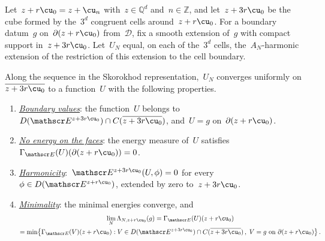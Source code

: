 \documentclass[11pt]{amsart}
\begin{document}
Let~$z+r\cu_0=z+\cu_n$ with~$z\in\mathbb Q^d$ and~$n\in\mathbb Z$, and let~$z+3r\cu_0$ be the cube formed by the~$3^d$ congruent cells around~$z+r\cu_0$. For a boundary datum~$g$ on~$\partial(z+r\cu_0)$ from~$\mathcal D$, fix a smooth extension of~$g$ with compact support in~$z+3r\cu_0$. Let~$U_N$ equal, on each of the~$3^d$ cells, the~$A_N$-harmonic extension of the restriction of this extension to the cell boundary.

\begin{proposition}
\label{mfd:prop-boundary}
Along the sequence in the Skorokhod representation,~$U_N$ converges uniformly on~$\overline{z+3r\cu_0}$ to a function~$U$ with the following properties.
\begin{enumerate}[label=(\roman*)]
\item \underline{\emph{Boundary values}}: the function~$U$ belongs to~$D(\mathscr E^{z+3r\cu_0})\cap C(\overline{z+3r\cu_0})$, and~$U=g$ on~$\partial(z+r\cu_0)$.
\item \underline{\emph{No energy on the faces}}: the energy measure of~$U$ satisfies~$\Gamma_{\mathscr E}(U)(\partial(z+r\cu_0))=0$.
\item \underline{\emph{Harmonicity}}:~$\mathscr E^{z+3r\cu_0}(U,\phi)=0$ for every~$\phi\in D(\mathscr E^{z+r\cu_0})$, extended by zero to~$z+3r\cu_0$.
\item \underline{\emph{Minimality}}: the minimal energies converge, and
\begin{multline*}
	\lim_N\Lambda_{N,z+r\cu_0}(g)=\Gamma_{\mathscr E}(U)(z+r\cu_0)\\
	=\min\bigl\{\Gamma_{\mathscr E}(V)(z+r\cu_0):V\in D(\mathscr E^{z+3r\cu_0})\cap C(\overline{z+3r\cu_0})\,,
	\; V=g\text{ on }\partial(z+r\cu_0)\bigr\}\,.
\end{multline*}
\end{enumerate}
\end{proposition}
\end{document}
